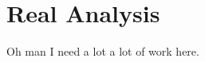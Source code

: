 \documentclass[main.tex]{subfiles}
\begin{document}
\section{Real Analysis}
Oh man I need a lot a lot of work here. 
\end{document}
